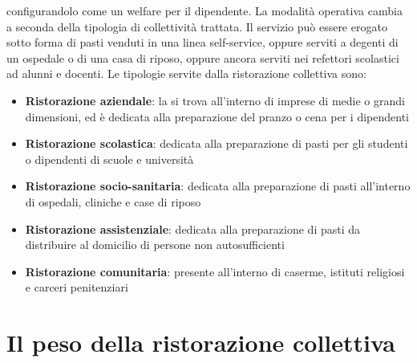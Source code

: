 \documentclass[a4paper, titlepage, 12pt, openright, twoside]{book}
\begin{document}
\begin{itemize}
											configurandolo come un welfare per il dipendente. La modalità operativa cambia a seconda della tipologia di collettività trattata.
											Il servizio può essere erogato sotto forma di pasti venduti in una linea self-service, oppure serviti a degenti di un ospedale o di una
											casa di riposo, oppure ancora serviti nei refettori scolastici ad alunni e docenti.
											Le tipologie servite dalla ristorazione collettiva sono:
											\begin{itemize}
												\item \textbf{Ristorazione aziendale}: la si trova all'interno di imprese di medie o grandi dimensioni, ed è dedicata alla preparazione
																						del pranzo o cena per i dipendenti
												\item \textbf{Ristorazione scolastica}: dedicata alla preparazione di pasti per gli studenti o dipendenti di scuole e università
												\item \textbf{Ristorazione socio-sanitaria}: dedicata alla preparazione di pasti all'interno di ospedali, cliniche e case di riposo
												\item \textbf{Ristorazione assistenziale}: dedicata alla preparazione di pasti da distribuire al domicilio di persone 
																							non autosufficienti
												\item \textbf{Ristorazione comunitaria}: presente all'interno di caserme, istituti religiosi e carceri penitenziari
											\end{itemize}
\end{itemize}

\section{Il peso della ristorazione collettiva}
\end{document}
